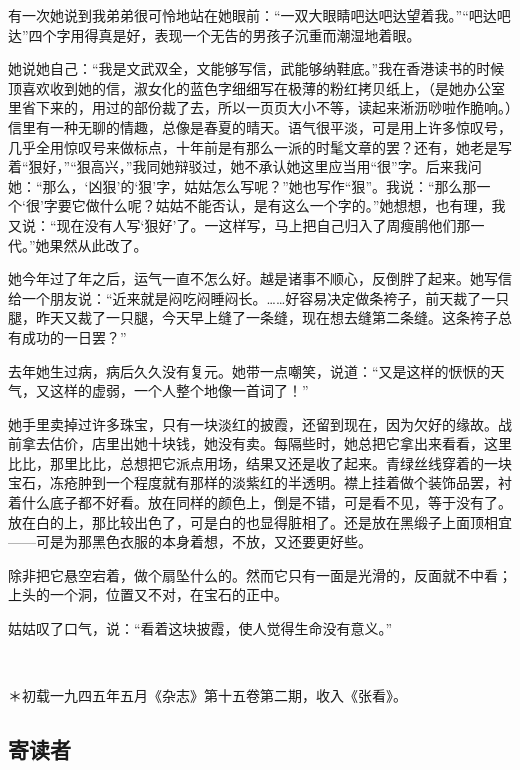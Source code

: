 \par 有一次她说到我弟弟很可怜地站在她眼前：“一双大眼睛吧达吧达望着我。”“吧达吧达”四个字用得真是好，表现一个无告的男孩子沉重而潮湿地着眼。
\par 她说她自己：“我是文武双全，文能够写信，武能够纳鞋底。”我在香港读书的时候顶喜欢收到她的信，淑女化的蓝色字细细写在极薄的粉红拷贝纸上，（是她办公室里省下来的，用过的部份裁了去，所以一页页大小不等，读起来淅沥唦啦作脆响。）信里有一种无聊的情趣，总像是春夏的晴天。语气很平淡，可是用上许多惊叹号，几乎全用惊叹号来做标点，十年前是有那么一派的时髦文章的罢？还有，她老是写着“狠好，”“狠高兴，”我同她辩驳过，她不承认她这里应当用“很”字。后来我问她：“那么，‘凶狠’的‘狠’字，姑姑怎么写呢？”她也写作“狠”。我说：“那么那一个‘很’字要它做什么呢？姑姑不能否认，是有这么一个字的。”她想想，也有理，我又说：“现在没有人写‘狠好’了。一这样写，马上把自己归入了周瘦鹃他们那一代。”她果然从此改了。
\par 她今年过了年之后，运气一直不怎么好。越是诸事不顺心，反倒胖了起来。她写信给一个朋友说：“近来就是闷吃闷睡闷长。……好容易决定做条袴子，前天裁了一只腿，昨天又裁了一只腿，今天早上缝了一条缝，现在想去缝第二条缝。这条袴子总有成功的一日罢？”
\par 去年她生过病，病后久久没有复元。她带一点嘲笑，说道：“又是这样的恹恹的天气，又这样的虚弱，一个人整个地像一首词了！”
\par 她手里卖掉过许多珠宝，只有一块淡红的披霞，还留到现在，因为欠好的缘故。战前拿去估价，店里出她十块钱，她没有卖。每隔些时，她总把它拿出来看看，这里比比，那里比比，总想把它派点用场，结果又还是收了起来。青绿丝线穿着的一块宝石，冻疮肿到一个程度就有那样的淡紫红的半透明。襟上挂着做个装饰品罢，衬着什么底子都不好看。放在同样的颜色上，倒是不错，可是看不见，等于没有了。放在白的上，那比较出色了，可是白的也显得脏相了。还是放在黑缎子上面顶相宜——可是为那黑色衣服的本身着想，不放，又还要更好些。
\par 除非把它悬空宕着，做个扇坠什么的。然而它只有一面是光滑的，反面就不中看；上头的一个洞，位置又不对，在宝石的正中。
\par 姑姑叹了口气，说：“看着这块披霞，使人觉得生命没有意义。”
\par  
\par ＊初载一九四五年五月《杂志》第十五卷第二期，收入《张看》。


\subsection{寄读者}

